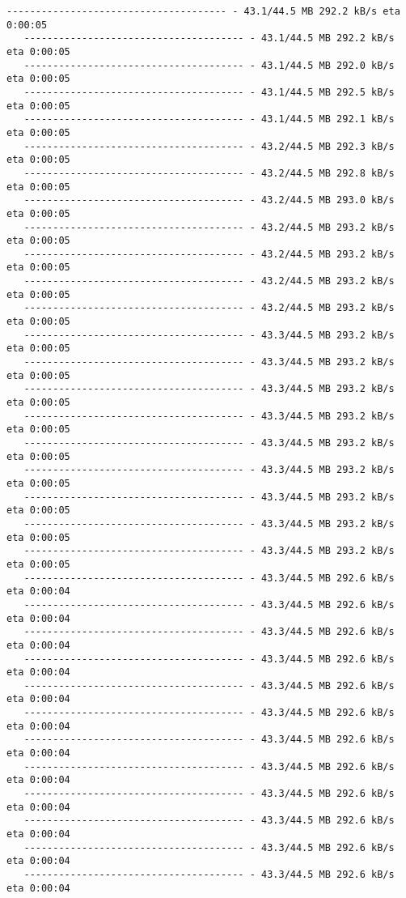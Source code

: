\documentclass[11pt]{article}
\begin{document}
\begin{Verbatim}[commandchars=\\\{\}]
   -------------------------------------- - 43.1/44.5 MB 292.2 kB/s eta 0:00:05
   -------------------------------------- - 43.1/44.5 MB 292.2 kB/s eta 0:00:05
   -------------------------------------- - 43.1/44.5 MB 292.0 kB/s eta 0:00:05
   -------------------------------------- - 43.1/44.5 MB 292.5 kB/s eta 0:00:05
   -------------------------------------- - 43.1/44.5 MB 292.1 kB/s eta 0:00:05
   -------------------------------------- - 43.2/44.5 MB 292.3 kB/s eta 0:00:05
   -------------------------------------- - 43.2/44.5 MB 292.8 kB/s eta 0:00:05
   -------------------------------------- - 43.2/44.5 MB 293.0 kB/s eta 0:00:05
   -------------------------------------- - 43.2/44.5 MB 293.2 kB/s eta 0:00:05
   -------------------------------------- - 43.2/44.5 MB 293.2 kB/s eta 0:00:05
   -------------------------------------- - 43.2/44.5 MB 293.2 kB/s eta 0:00:05
   -------------------------------------- - 43.2/44.5 MB 293.2 kB/s eta 0:00:05
   -------------------------------------- - 43.3/44.5 MB 293.2 kB/s eta 0:00:05
   -------------------------------------- - 43.3/44.5 MB 293.2 kB/s eta 0:00:05
   -------------------------------------- - 43.3/44.5 MB 293.2 kB/s eta 0:00:05
   -------------------------------------- - 43.3/44.5 MB 293.2 kB/s eta 0:00:05
   -------------------------------------- - 43.3/44.5 MB 293.2 kB/s eta 0:00:05
   -------------------------------------- - 43.3/44.5 MB 293.2 kB/s eta 0:00:05
   -------------------------------------- - 43.3/44.5 MB 293.2 kB/s eta 0:00:05
   -------------------------------------- - 43.3/44.5 MB 293.2 kB/s eta 0:00:05
   -------------------------------------- - 43.3/44.5 MB 293.2 kB/s eta 0:00:05
   -------------------------------------- - 43.3/44.5 MB 292.6 kB/s eta 0:00:04
   -------------------------------------- - 43.3/44.5 MB 292.6 kB/s eta 0:00:04
   -------------------------------------- - 43.3/44.5 MB 292.6 kB/s eta 0:00:04
   -------------------------------------- - 43.3/44.5 MB 292.6 kB/s eta 0:00:04
   -------------------------------------- - 43.3/44.5 MB 292.6 kB/s eta 0:00:04
   -------------------------------------- - 43.3/44.5 MB 292.6 kB/s eta 0:00:04
   -------------------------------------- - 43.3/44.5 MB 292.6 kB/s eta 0:00:04
   -------------------------------------- - 43.3/44.5 MB 292.6 kB/s eta 0:00:04
   -------------------------------------- - 43.3/44.5 MB 292.6 kB/s eta 0:00:04
   -------------------------------------- - 43.3/44.5 MB 292.6 kB/s eta 0:00:04
   -------------------------------------- - 43.3/44.5 MB 292.6 kB/s eta 0:00:04
   -------------------------------------- - 43.3/44.5 MB 292.6 kB/s eta 0:00:04

\end{Verbatim}
\end{document}
